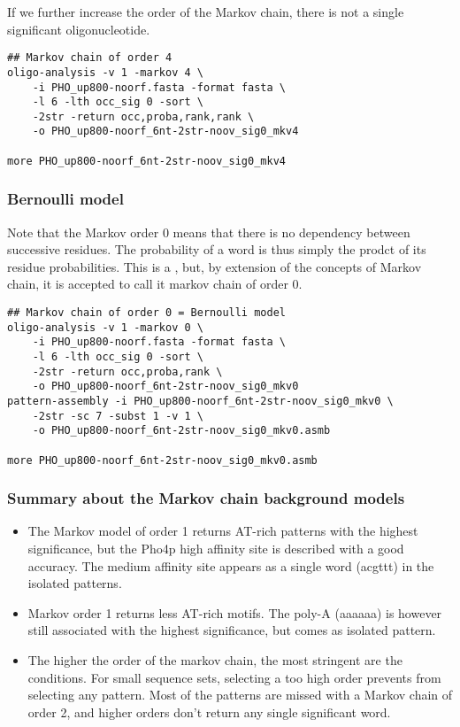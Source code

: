 If we further increase the order of the Markov chain, there is not a
single significant oligonucleotide. 

{\color{Blue} \begin{footnotesize}
\begin{verbatim}
## Markov chain of order 4
oligo-analysis -v 1 -markov 4 \
    -i PHO_up800-noorf.fasta -format fasta \
    -l 6 -lth occ_sig 0 -sort \
    -2str -return occ,proba,rank,rank \
    -o PHO_up800-noorf_6nt-2str-noov_sig0_mkv4

more PHO_up800-noorf_6nt-2str-noov_sig0_mkv4
\end{verbatim} \end{footnotesize}
}


\subsubsection{Bernoulli model}

Note that the Markov order 0 means that there is no dependency between
successive residues. The probability of a word is thus simply the
prodct of its residue probabilities. This is a , but, by extension of the concepts of Markov chain, it is
accepted to call it markov chain of order 0.

{\color{Blue} \begin{footnotesize} 
\begin{verbatim}
## Markov chain of order 0 = Bernoulli model
oligo-analysis -v 1 -markov 0 \
    -i PHO_up800-noorf.fasta -format fasta \
    -l 6 -lth occ_sig 0 -sort \
    -2str -return occ,proba,rank \
    -o PHO_up800-noorf_6nt-2str-noov_sig0_mkv0
pattern-assembly -i PHO_up800-noorf_6nt-2str-noov_sig0_mkv0 \
    -2str -sc 7 -subst 1 -v 1 \
    -o PHO_up800-noorf_6nt-2str-noov_sig0_mkv0.asmb

more PHO_up800-noorf_6nt-2str-noov_sig0_mkv0.asmb
\end{verbatim} \end{footnotesize}
}


\subsubsection{Summary about the Markov chain background models}

\begin{itemize}
\item The Markov model of order 1 returns AT-rich patterns with the
  highest significance, but the Pho4p high affinity site is described
  with a good accuracy. The medium affinity site appears as a single
  word (acgttt) in the isolated patterns.
\item Markov order 1 returns less AT-rich motifs. The poly-A (aaaaaa)
  is however still associated with the highest significance, but comes
  as isolated pattern.
\item The higher the order of the markov chain, the most stringent are
  the conditions. For small sequence sets, selecting a too high order
  prevents from selecting any pattern. Most of the patterns are missed
  with a Markov chain of order 2, and higher orders don't return any
  single significant word.
\end{itemize}


